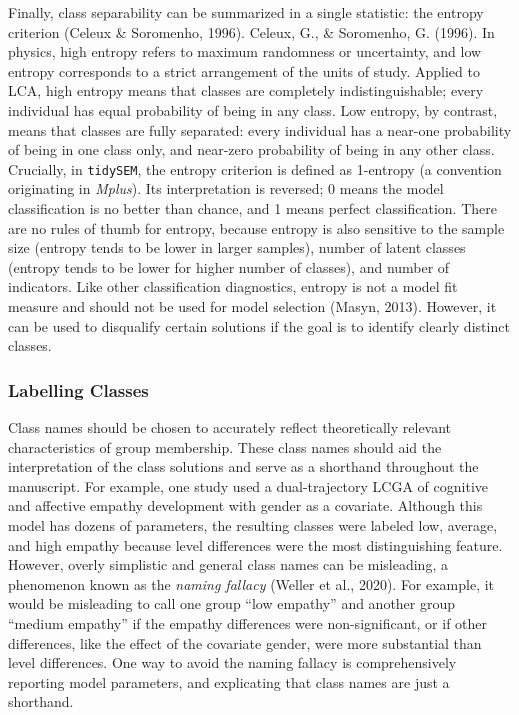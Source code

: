 \documentclass[
  ,man,floatsintext]{apa6}
\begin{document}
Finally, class separability can be summarized in a single statistic:
the entropy criterion (Celeux \& Soromenho, 1996).
Celeux, G., \& Soromenho, G. (1996).
In physics, high entropy refers to maximum randomness or uncertainty,
and low entropy corresponds to a strict arrangement of the units of study.
Applied to LCA, high entropy means that classes are completely indistinguishable; every individual has equal probability of being in any class.
Low entropy, by contrast, means that classes are fully separated: every individual has a near-one probability of being in one class only, and near-zero probability of being in any other class.
Crucially, in \texttt{tidySEM}, the entropy criterion is defined as 1-entropy (a convention originating in \emph{Mplus}).
Its interpretation is reversed;
0 means the model classification is no better than chance,
and 1 means perfect classification.
There are no rules of thumb for entropy,
because entropy is also sensitive to the sample size (entropy tends to be lower in larger samples),
number of latent classes (entropy tends to be lower for higher number of classes),
and number of indicators.
Like other classification diagnostics,
entropy is not a model fit measure and should not be used for model selection (Masyn, 2013).
However, it can be used to disqualify certain solutions if the goal is to identify clearly distinct classes.

\hypertarget{labelling-classes}{%
\subsubsection{Labelling Classes}\label{labelling-classes}}

Class names should be chosen to accurately reflect theoretically relevant characteristics of group membership.
These class names should aid the interpretation of the class solutions and serve as a shorthand throughout the manuscript.
For example, one study used a dual-trajectory LCGA of cognitive and affective empathy development with gender as a covariate.
Although this model has dozens of parameters,
the resulting classes were labeled low, average, and high empathy because level differences were the most distinguishing feature.
However, overly simplistic and general class names can be misleading, a phenomenon known as the \emph{naming fallacy} (Weller et al., 2020).
For example, it would be misleading to call one group ``low empathy'' and another group ``medium empathy'' if the empathy differences were non-significant,
or if other differences, like the effect of the covariate gender, were more substantial than level differences.
One way to avoid the naming fallacy is comprehensively reporting model parameters,
and explicating that class names are just a shorthand.
\end{document}
